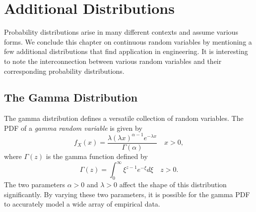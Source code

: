 \section{Additional Distributions}

Probability distributions arise in many different contexts and assume various forms.
We conclude this chapter on continuous random variables by mentioning a few additional distributions that find application in engineering.
It is interesting to note the interconnection between various random variables and their corresponding probability distributions.


\subsection{The Gamma Distribution}

The gamma distribution defines a versatile collection of random variables.
The PDF of a \emph{gamma random variable} is given by 
\begin{equation*}
f_X (x) = \frac{\lambda (\lambda x)^{\alpha - 1} e^{-\lambda x}}{\Gamma (\alpha)} \quad  x > 0,
\end{equation*}
where $\Gamma(z)$ is the gamma function defined by
\begin{equation*}
\Gamma (z) = \int_0^{\infty} \xi^{z-1} e^{-\xi} d\xi \quad z > 0 .
\end{equation*}
The two parameters $\alpha > 0$ and $\lambda > 0$ affect the shape of this distribution significantly.
By varying these two parameters, it is possible for the gamma PDF to accurately model a wide array of empirical data.

